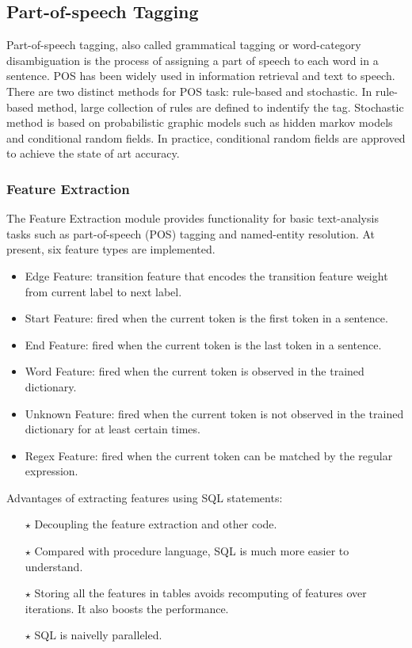 \documentclass[11pt,letterpaper]{article}
\begin{document}
\subsection{Part-of-speech Tagging}
Part-of-speech tagging, also called grammatical tagging or word-category disambiguation is the process of assigning 
a part of speech to each word in a sentence. POS has been widely used in information retrieval and text to speech. 
There are two distinct methods for 
POS task: rule-based and stochastic.
In rule-based method, large collection of rules are defined to indentify the tag. Stochastic method is based on 
probabilistic graphic models such as hidden markov models and conditional random fields. In practice, 
conditional random fields are approved to achieve the state of art accuracy.

\subsubsection{Feature Extraction}
The Feature Extraction module provides functionality for basic text-analysis
tasks such as part-of-speech (POS) tagging and named-entity resolution.
At present, six feature types are implemented.
\begin{itemize}
\item Edge Feature: transition feature that encodes the transition feature weight from current label to next label.
\item Start Feature: fired when the current token is the first token in a sentence.
\item End Feature: fired when the current token is the last token in a sentence.
\item Word Feature: fired when the current token is observed in the trained dictionary.
\item Unknown Feature: fired when the current token is not observed in the trained dictionary for at least certain times.
\item Regex Feature: fired when the current token can be matched by the regular expression.
\end{itemize}

Advantages of extracting features using SQL statements:
\begin{itemize}
\item [$\star$] Decoupling the feature extraction and other code.
\item [$\star$] Compared with procedure language, SQL is much more easier to understand.
\item [$\star$] Storing all the features in tables avoids recomputing of features over iterations. It also boosts the performance.
\item [$\star$] SQL is naivelly paralleled.
\end{itemize}
\end{document}
